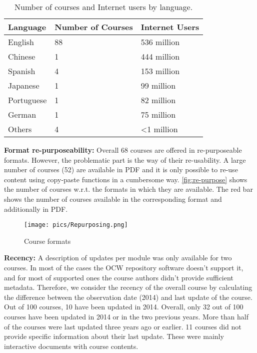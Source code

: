 \documentclass{sig-alternate}
\theoremstyle{definition}
\begin{document}
\begin{table}[ht]
\begin{tabular}{p{.15\linewidth}p{.32\linewidth}p{.42\linewidth}}
\hline
\textbf{Language} & \textbf{Number of Courses} & \textbf{Internet Users} \\ \hline
English & 88 & 536 million \\
Chinese & 1 & 444 million \\
Spanish & 4 & 153 million \\
Japanese & 1 & 99 million \\
Portuguese & 1 & 82 million \\
German & 1 & 75 million \\
Others & 4 & <1 million \\
\end{tabular}
\caption{Number of courses and Internet users by language.}
\label{tab:multilingual}
\end{table}
 


\noindent\textbf{Format re-purposeability:}
Overall 68 courses are offered in re-purposeable formats.
However, the problematic part is the way of their re-usability.
A large number of courses (52) are available in PDF and it is only possible to re-use content using copy-paste functions in a cumbersome way.
\autoref{fig:re-purpose} shows the number of courses w.r.t. the formats in which they are available.
The red bar shows the number of courses available in the corresponding format and additionally in PDF.
\begin{figure}[h]
\texttt{[image: pics/Repurposing.png]}
\caption{Course formats}\label{fig:re-purpose}
\end{figure}

\noindent\textbf{Recency:}
A description of updates per module was only available for two courses.
In most of the cases the OCW repository software doesn't support it, and for most of supported ones the course authors didn't provide sufficient metadata.
Therefore, we consider the recency of the overall course by calculating the difference between the observation date (2014) and last update of the course.
Out of 100 courses, 10 have been updated in 2014.
Overall, only 32 out of 100 courses have been updated in 2014 or in the two previous years.
More than half of the courses were last updated three years ago or earlier.
11 courses did not provide specific information about their last update.
These were mainly interactive documents with course contents. 
\end{document}
